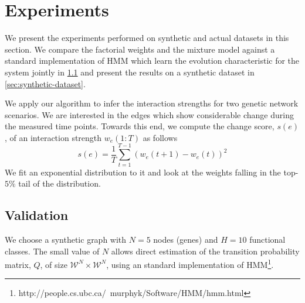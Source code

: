 \documentclass{bioinfo}
\begin{document}
\begin{methods}


\end{methods}
\section{Experiments}
\label{sec:experiments}
We present the experiments performed on synthetic and actual datasets
in this section. We compare the factorial weights and the mixture
model against a standard implementation of HMM which learn
the evolution characteristic for the system jointly in
\ref{sec:validation} and present the results on a synthetic dataset in
\ref{sec:synthetic-dataset}.

We apply our algorithm to infer the interaction strengths for two
genetic network scenarios. We are interested in the edges which show
considerable change during the measured time points. Towards this end,
we compute the change score, $s(e)$, of an interaction strength $w_{e}(1:T)$ as follows
\begin{equation}
  \label{eq:change-score}
  s(e) = \frac{1}{T} \sum_{t=1}^{T-1} (w_{e}(t+1) - w_{e}(t))^{2} 
\end{equation}
We fit an exponential distribution to it and look at the weights
falling in the top-$5 \%$ tail of the distribution.  
\subsection{Validation}
\label{sec:validation}
We choose a synthetic graph with $N=5$ nodes (genes) and $H=10$ functional
classes. The small value of $N$ allows direct estimation of the
transition probability matrix, $Q$,  of size ${\mathcal W}^{N} \times {\mathcal W}^{N}$,
using an standard implementation of
HMM\footnote{http://people.cs.ubc.ca/~murphyk/Software/HMM/hmm.html}.
\end{document}
